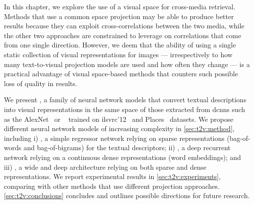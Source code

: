 In this chapter, we explore the use of a visual space for cross-media retrieval.
Methods that use a common space projection may be able to produce better results because they can exploit cross-correlations between the two media, while the other two approaches are constrained to leverage on correlations that come from one single direction.
However, we deem that the ability of using a single static collection of visual representations for images --- irrespectively to how many text-to-visual projection models are used and how often they change --- is a practical advantage of visual space-based methods that counters such possible loss of quality in results.


We present %
\ttv{}, a family of neural network models that convert textual descriptions into visual representations in the same space of those extracted from \glspl{dcnn} such as the AlexNet~\cite{krizhevsky2012imagenet} or \resnet{}~\cite{he2016deep} trained on \gls{ilsvrc}'12~\cite{russakovsky2015imagenet} and Places~\cite{zhou2014learning} datasets.
We propose different neural network models of increasing complexity in \ref{sec:t2v:method}, including i) \sparsettv{}, a simple regressor network relying on sparse representations (bag-of-words and bag-of-bigrams) for the textual descriptors; ii) \densettv{}, a deep recurrent network relying on a continuous dense representations (word embeddings); and iii) \widedeepttv{}, a wide and deep architecture relying on both sparse and dense representations.
We report experimental results in \ref{sec:t2v:experiments}, comparing with other methods that use different projection approaches.
\ref{sec:t2v:conclusions} concludes and outlines possible directions for future research.

